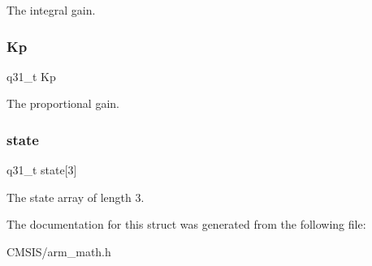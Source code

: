 The integral gain. \mbox{\label{structarm__pid__instance__q31_a6ec4b37fe2246a7e017dd07578fe5bbd}} 
\subsubsection{\texorpdfstring{Kp}{Kp}}
{\footnotesize\ttfamily q31\+\_\+t Kp}

The proportional gain. \mbox{\label{structarm__pid__instance__q31_af0a2da4da9a94af652873ec7e7be4880}} 
\subsubsection{\texorpdfstring{state}{state}}
{\footnotesize\ttfamily q31\+\_\+t state\mbox{[}3\mbox{]}}

The state array of length 3. 

The documentation for this struct was generated from the following file\+:\begin{DoxyCompactItemize}
\item 
C\+M\+S\+I\+S/arm\+\_\+math.\+h\end{DoxyCompactItemize}
